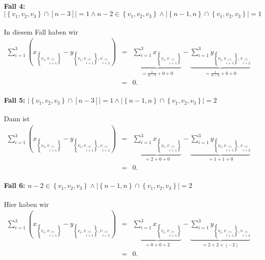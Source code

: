 \documentclass[10p,a4paper,BCOR = 12mm, DIV=15]{scrbook}
\begin{document}
\begin{bew}
\paragraph{Fall 4: $\left|\left\{v_1, v_2, v_3\right\} \cap \left[n-3\right]\right| = 1 \wedge n-2 \in\left\{v_1, v_2, v_3\right\} \wedge  \left|\left\{n-1, n\right\} \cap \left\{v_1, v_2, v_3\right\}\right| = 1$} In diesem Fall haben wir
\begin{eqnarray*}
\sum_{i=1}^3 \left(x_{\left\{v_{i}, v_{i \stackrel{\left[3\right]}{+} 1}\right\}} - y_{\left\{v_{i}, v_{i \stackrel{\left[3\right]}{+} 1}\right\}, v_{i \stackrel{\left[3\right]}{+} 2}}\right) & = & \underbrace{\sum_{i=1}^3 x_{\left\{v_{i}, v_{i \stackrel{\left[3\right]}{+} 1}\right\}}}_{= \frac{1}{n-3} + 0 + 0} - \underbrace{\sum_{i=1}^3 y_{\left\{v_{i}, v_{i \stackrel{\left[3\right]}{+} 1}\right\}, v_{i \stackrel{\left[3\right]}{+} 2}}}_{= \frac{1}{n-3} + 0 + 0} \\
& = & 0.
\end{eqnarray*}

\paragraph{Fall 5: $\left|\left\{v_1, v_2, v_3\right\} \cap \left[n-3\right]\right| = 1 \wedge  \left|\left\{n-1, n\right\} \cap \left\{v_1, v_2, v_3\right\}\right| = 2$} Dann ist
\begin{eqnarray*}
\sum_{i=1}^3 \left(x_{\left\{v_{i}, v_{i \stackrel{\left[3\right]}{+} 1}\right\}} - y_{\left\{v_{i}, v_{i \stackrel{\left[3\right]}{+} 1}\right\}, v_{i \stackrel{\left[3\right]}{+} 2}}\right) & = & \underbrace{\sum_{i=1}^3 x_{\left\{v_{i}, v_{i \stackrel{\left[3\right]}{+} 1}\right\}}}_{= 2 + 0 + 0} - \underbrace{\sum_{i=1}^3 y_{\left\{v_{i}, v_{i \stackrel{\left[3\right]}{+} 1}\right\}, v_{i \stackrel{\left[3\right]}{+} 2}}}_{= 1 + 1 + 0} \\
& = & 0.
\end{eqnarray*}

\paragraph{Fall 6: $n-2 \in \left\{v_1, v_2, v_3\right\} \wedge  \left|\left\{n-1, n\right\} \cap \left\{v_1, v_2, v_3\right\}\right| = 2$} Hier haben wir
\begin{eqnarray*}
\sum_{i=1}^3 \left(x_{\left\{v_{i}, v_{i \stackrel{\left[3\right]}{+} 1}\right\}} - y_{\left\{v_{i}, v_{i \stackrel{\left[3\right]}{+} 1}\right\}, v_{i \stackrel{\left[3\right]}{+} 2}}\right) & = & \underbrace{\sum_{i=1}^3 x_{\left\{v_{i}, v_{i \stackrel{\left[3\right]}{+} 1}\right\}}}_{= 0 + 0 + 2} - \underbrace{\sum_{i=1}^3 y_{\left\{v_{i}, v_{i \stackrel{\left[3\right]}{+} 1}\right\}, v_{i \stackrel{\left[3\right]}{+} 2}}}_{= 2 + 2 + \left(-2\right)} \\
& = & 0.
\end{eqnarray*}


\end{bew}
\end{document}
